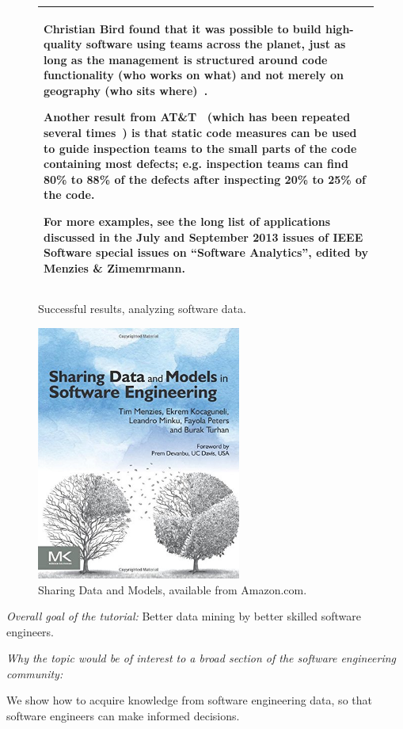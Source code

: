 \documentclass[conference]{IEEEtran}
\begin{document}
\begin{figure}[!t]
\begin{tabular}{|p{.95\linewidth}|}\hline
  Christian Bird found that it was  possible to build high-quality software using teams across the planet, just as long as the management is structured around code functionality (who works on what) and not merely on geography (who sits where)~\cite{bird09a}.

Another result from AT\&T~\cite{ostrand04} (which has been repeated several times~\cite{me10a,tosun10}) is that static code measures can be used to guide inspection teams to the small parts of the code containing most defects; e.g. inspection teams can find 80\% to 88\% of the defects after inspecting 20\% to 25\% of the code. 
 
For more examples, see the long list of applications discussed in the July and September 2013 issues of IEEE Software special issues on “Software Analytics”, edited by Menzies \& Zimemrmann.
\\\hline
\end{tabular}
\caption{Successful results, analyzing software data.}
\end{figure}
\begin{figure}[!t]
\centering
\includegraphics[width=2.65in]{book.jpg}
\caption{Sharing Data and Models,
available from Amazon.com.}
\label{fig:book}
\end{figure}
 
{\em Overall goal of the tutorial:} Better data mining by better skilled software engineers.


{\em Why the topic would be of interest to a broad section of the software engineering community:} 

  We show how to acquire knowledge from software engineering data, so that software engineers can make informed decisions.
\end{document}
